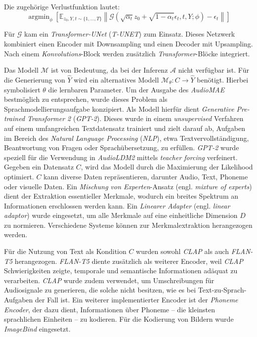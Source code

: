 \documentclass[
  a4paper,  %
  twoside,  %
  bibliography=totoc,
  headsepline,
  cleardoublepage=empty,
  parskip=half,
  draft=false
]{scrbook}
\begin{document}
Die zugehörige Verlustfunktion lautet:
\begin{equation}
\operatorname{argmin}_\phi\left[\mathbb{E}_{z_0, Y, t \sim\{1, \ldots, T\}}\left\|\mathcal{G}\left(\sqrt{\alpha_t} z_0+\sqrt{1-\alpha_t} \epsilon_t, t, Y ; \phi\right)-\epsilon_t\right\|\right]
\end{equation}

Für $\mathcal{G}$ kam ein \emph{Transformer-UNet} (\emph{T-UNET}) zum Einsatz. Dieses Netzwerk kombiniert einen Encoder mit Downsampling und einen Decoder mit Upsampling. Nach einem \emph{Konvolutions}-Block werden zusätzlich \emph{Transformer}-Blöcke integriert.

Das Modell $\mathcal{M}$ ist von Bedeutung, da bei der Inferenz $\mathcal{A}$ nicht verfügbar ist. Für die Generierung von $\hat{Y}$ wird ein alternatives Modell $\mathcal{M}_\theta: C \rightarrow \hat{Y}$ benötigt. Hierbei symbolisiert $\theta$ die lernbaren Parameter. Um der Ausgabe des \emph{AudioMAE} bestmöglich zu entsprechen, wurde dieses Problem als Sprachmodellierungsaufgabe konzipiert. Als Modell hierfür dient \emph{Generative Pre-trained Transformer 2} (\emph{GPT-2})\cite{alec_radford_jeff_wu_rewon_child_david_luan_dario_amodei_ilya_sutskever_language_2019}. Dieses wurde in einem \emph{unsupervised} Verfahren auf einem umfangreichen Textdatensatz trainiert und zielt darauf ab, Aufgaben im Bereich des \emph{Natural Language Processing} (\emph{NLP}), etwa Textvervollständigung, Beantwortung von Fragen oder Sprachübersetzung, zu erfüllen. \emph{GPT-2} wurde speziell für die Verwendung in \emph{AudioLDM2} mittels \emph{teacher forcing}\cite{kolen_field_2001} verfeinert. Gegeben ein Datensatz $C$, wird das Modell durch die Maximierung der Likelihood optimiert. $C$ kann diverse Daten repräsentieren, darunter Audio, Text, Phoneme oder visuelle Daten. Ein \emph{Mischung von Experten}-Ansatz (engl. \emph{mixture of experts})\cite{masoudnia_mixture_2014} dient der Extraktion essentieller Merkmale, wodurch ein breites Spektrum an Informationen erschlossen werden kann. Ein \emph{Linearer Adapter} (engl. \emph{linear adaptor}) wurde eingesetzt, um alle Merkmale auf eine einheitliche Dimension $D$ zu normieren. Verschiedene Systeme können zur Merkmalextraktion herangezogen werden.

Für die Nutzung von Text als Kondition $C$ wurden sowohl \emph{CLAP}\cite{wu_large-scale_2023} als auch \emph{FLAN-T5}\cite{chung_scaling_2022} herangezogen. \emph{FLAN-T5} diente zusätzlich als weiterer Encoder, weil \emph{CLAP} Schwierigkeiten zeigte, temporale und semantische Informationen adäquat zu verarbeiten. \emph{CLAP} wurde zudem verwendet, um Umschreibungen für Audiosignale zu generieren, die solche nicht besitzen, wie es bei Text-zu-Sprach-Aufgaben der Fall ist. Ein weiterer implementierter Encoder ist der \emph{Phoneme Encoder}, der dazu dient, Informationen über Phoneme – die kleinsten sprachlichen Einheiten – zu kodieren. Für die Kodierung von Bildern wurde \emph{ImageBind}\cite{girdhar_imagebind_2023} eingesetzt.
\end{document}
